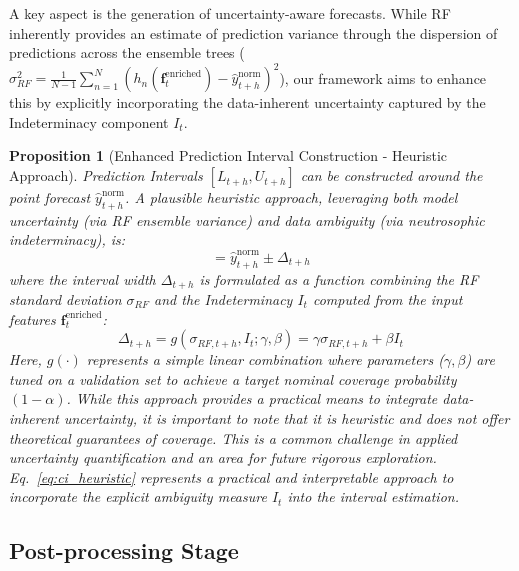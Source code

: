 \documentclass[review,3p,times]{elsarticle}
\newtheorem{proposition}[definition]{Proposition}
\begin{document}
A key aspect is the generation of uncertainty-aware forecasts. While RF inherently provides an estimate of prediction variance through the dispersion of predictions across the ensemble trees ($\sigma_{RF}^2 = \frac{1}{N-1}\sum_{n=1}^N (h_n(\mathbf{f}_t^{\text{enriched}}) - \hat{y}_{t+h}^{\text{norm}})^2$), our framework aims to enhance this by explicitly incorporating the data-inherent uncertainty captured by the Indeterminacy component $I_t$.

\begin{proposition}[Enhanced Prediction Interval Construction - Heuristic Approach]
\label{prop:ci_construction}
Prediction Intervals $[L_{t+h}, U_{t+h}]$ can be constructed around the point forecast $\hat{y}_{t+h}^{\text{norm}}$. A plausible heuristic approach, leveraging both model uncertainty (via RF ensemble variance) and data ambiguity (via neutrosophic indeterminacy), is:
\begin{equation}
    [L_{t+h}, U_{t+h}] = \hat{y}_{t+h}^{\text{norm}} \pm \Delta_{t+h}
\end{equation}
where the interval width $\Delta_{t+h}$ is formulated as a function combining the RF standard deviation $\sigma_{RF}$ and the Indeterminacy $I_t$ computed from the input features $\mathbf{f}_t^{\text{enriched}}$:
\begin{equation}
    \label{eq:ci_heuristic}
    \Delta_{t+h} = g(\sigma_{RF, t+h}, I_t; \gamma, \beta) = \gamma \sigma_{RF, t+h} + \beta I_t
\end{equation}
Here, $g(\cdot)$ represents a simple linear combination where parameters ($\gamma, \beta$) are tuned on a validation set to achieve a target nominal coverage probability $(1-\alpha)$. While this approach provides a practical means to integrate data-inherent uncertainty, it is important to note that it is heuristic and does not offer theoretical guarantees of coverage. This is a common challenge in applied uncertainty quantification and an area for future rigorous exploration. Eq.~\ref{eq:ci_heuristic} represents a practical and interpretable approach to incorporate the explicit ambiguity measure $I_t$ into the interval estimation.
\end{proposition}

\subsection{Post-processing Stage}
\label{sec:postprocessing}
\end{document}
